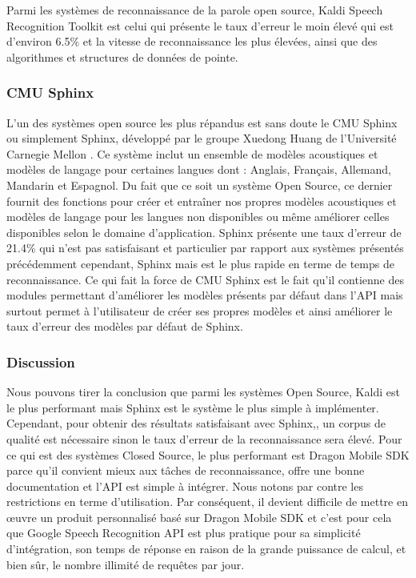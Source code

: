 Parmi les systèmes de reconnaissance de la parole open source, Kaldi Speech Recognition Toolkit est celui qui présente le taux d'erreur le moin élevé qui est d'environ 6.5\% \cite{sphinxkalidiaccuracy}  et la vitesse de reconnaissance les plus élevées, ainsi que des algorithmes et structures de données de pointe.


\subsubsection{CMU Sphinx}
L'un des systèmes open source les plus répandus est sans doute le CMU Sphinx ou simplement Sphinx, développé par le groupe Xuedong Huang de l'Université Carnegie Mellon \cite{sphinxapi}. Ce système inclut un ensemble de modèles acoustiques et modèles de langage pour certaines langues dont : Anglais, Français, Allemand, Mandarin et Espagnol. Du fait que ce soit un système Open Source, ce dernier fournit des fonctions pour créer et entraîner nos propres modèles acoustiques et modèles de langage pour les langues non disponibles ou même améliorer celles disponibles selon le domaine d'application. Sphinx présente une taux d'erreur de 21.4\%  \cite{sphinxkalidiaccuracy}  qui n'est pas satisfaisant et particulier par rapport aux systèmes présentés précédemment cependant, Sphinx mais est le plus rapide en terme de temps de reconnaissance. Ce qui fait la force de CMU Sphinx est le fait qu'il contienne des modules permettant d'améliorer les modèles présents par défaut dans l'API mais surtout permet à l'utilisateur de créer ses propres modèles et ainsi améliorer le taux d'erreur des modèles par défaut de Sphinx.

\subsubsection{Discussion}
Nous pouvons tirer la conclusion que parmi les systèmes Open Source, Kaldi est le plus performant mais Sphinx est le système le plus simple à implémenter. Cependant, pour obtenir des résultats satisfaisant avec Sphinx,, un corpus de qualité est nécessaire sinon le taux d'erreur de la reconnaissance sera élevé. Pour ce qui est des systèmes Closed Source, le plus performant est Dragon Mobile SDK parce qu'il convient mieux aux tâches de reconnaissance, offre une bonne documentation et l'API est simple à intégrer. Nous notons par contre les restrictions en terme d'utilisation. Par conséquent, il devient difficile de mettre en œuvre un produit personnalisé basé sur Dragon Mobile SDK et c'est pour cela que Google Speech Recognition API est plus pratique pour sa simplicité d'intégration, son temps de réponse en raison de la grande puissance de calcul, et bien sûr, le nombre illimité de requêtes par jour.

